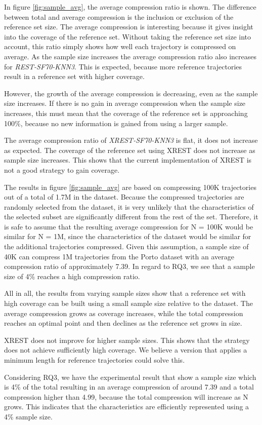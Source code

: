 In figure \ref{fig:sample_avg}, the average compression ratio is shown. The difference between total and average compression is the inclusion or exclusion of the reference set size. The average compression is interesting because it gives insight into the coverage of the reference set. Without taking the reference set size into account, this ratio simply shows how well each trajectory is compressed on average. As the sample size increases the average compression ratio also increases for \textit{REST-SF70-KNN3}. This is expected, because more reference trajectories result in a reference set with higher coverage.

However, the growth of the average compression is decreasing, even as the sample size increases. If there is no gain in average compression when the sample size increases, this must mean that the coverage of the reference set is approaching 100\%, because no new information is gained from using a larger sample.

The average compression ratio of \textit{XREST-SF70-KNN3} is flat, it does not increase as expected. The coverage of the reference set using XREST does not increase as sample size increases. This shows that the current implementation of XREST is not a good strategy to gain coverage.

The results in figure \ref{fig:sample_avg} are based on compressing 100K trajectories out of a total of 1.7M in the dataset. Because the compressed trajectories are randomly selected from the dataset, it is very unlikely that the characteristics of the selected subset are significantly different from the rest of the set. Therefore, it is safe to assume that the resulting average compression for N = 100K would be similar for N = 1M, since the characteristics of the dataset would be similar for the additional trajectories compressed. Given this assumption, a sample size of 40K can compress 1M trajectories from the Porto dataset with an average compression ratio of approximately 7.39. In regard to RQ3, we see that a sample size of 4\% reaches a high compression ratio.

All in all, the results from varying sample sizes show that a reference set with high coverage can be built using a small sample size relative to the dataset. The average compression grows as coverage increases, while the total compression reaches an optimal point and then declines as the reference set grows in size.

XREST does not improve for higher sample sizes. This shows that the strategy does not achieve sufficiently high coverage. We believe a version that applies a minimum length for reference trajectories could solve this.

Considering RQ3, we have the experimental result that show a sample size which is 4\% of the total resulting in an average compression of around 7.39 and a total compression higher than 4.99, because the total compression will increase as N grows. This indicates that the characteristics are efficiently represented using a 4\% sample size.